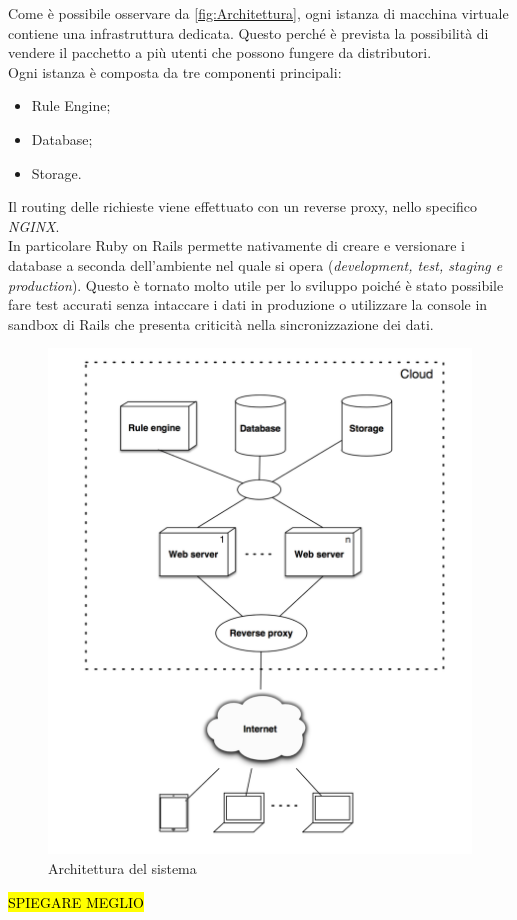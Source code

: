 Come è possibile osservare da \autoref{fig:Architettura}, ogni istanza di macchina virtuale contiene una infrastruttura dedicata. Questo perché è prevista la possibilità di vendere il pacchetto a più utenti che possono fungere da distributori.\\
Ogni istanza è composta da tre componenti principali:
\begin{itemize}
	\item Rule Engine;
	\item Database;
	\item Storage.
\end{itemize}
Il routing delle richieste viene effettuato con un \gls{reverse proxy}, nello specifico \textit{NGINX}. \\
In particolare Ruby on Rails permette nativamente di creare e versionare i database a seconda dell'ambiente nel quale si opera (\textit{development, test, staging e production}). Questo è tornato molto utile per lo sviluppo poiché è stato possibile fare test accurati senza intaccare i dati in produzione o utilizzare la console in sandbox di Rails che presenta criticità nella sincronizzazione dei dati.
\begin{figure}[H]
	\begin{center}
		\includegraphics[width=12cm]{Pics/architettura.png}
		\caption{Architettura del sistema}
		\label{fig:Architettura}
	\end{center}
\end{figure}
\hl{SPIEGARE MEGLIO}
